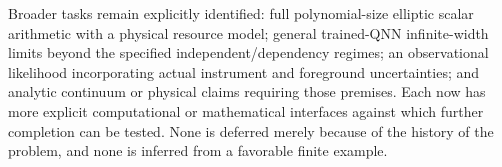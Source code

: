 Broader tasks remain explicitly identified: full polynomial-size elliptic scalar arithmetic with a physical resource model; general trained-QNN infinite-width limits beyond the specified independent/dependency regimes; an observational likelihood incorporating actual instrument and foreground uncertainties; and analytic continuum or physical claims requiring those premises. Each now has more explicit computational or mathematical interfaces against which further completion can be tested. None is deferred merely because of the history of the problem, and none is inferred from a favorable finite example.
